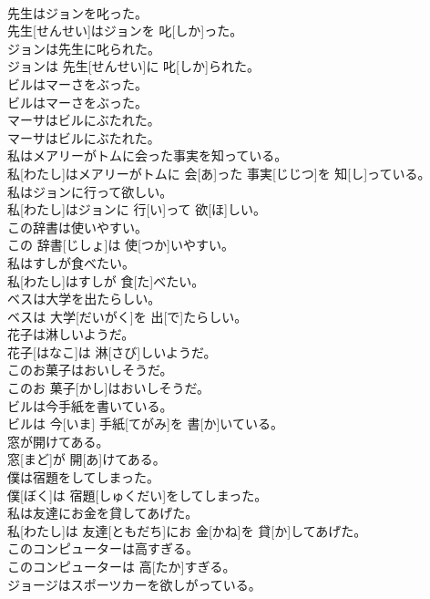 \documentclass[8pt]{extreport}
\begin{document}
\begin{CJK}{UTF8}{min}
\\	先生はジョンを叱った。	
\\	先生[せんせい]はジョンを 叱[しか]った。
\\	ジョンは先生に叱られた。	
\\	ジョンは 先生[せんせい]に 叱[しか]られた。
\\	ビルはマーさをぶった。	
\\	ビルはマーさをぶった。
\\	マーサはビルにぶたれた。	
\\	マーサはビルにぶたれた。
\\	私はメアリーがトムに会った事実を知っている。	
\\	私[わたし]はメアリーがトムに 会[あ]った 事実[じじつ]を 知[し]っている。
\\	私はジョンに行って欲しい。	
\\	私[わたし]はジョンに 行[い]って 欲[ほ]しい。
\\	この辞書は使いやすい。	
\\	この 辞書[じしょ]は 使[つか]いやすい。
\\	私はすしが食べたい。	
\\	私[わたし]はすしが 食[た]べたい。
\\	ベスは大学を出たらしい。	
\\	ベスは 大学[だいがく]を 出[で]たらしい。
\\	花子は淋しいようだ。	
\\	花子[はなこ]は 淋[さび]しいようだ。
\\	このお菓子はおいしそうだ。	
\\	このお 菓子[かし]はおいしそうだ。
\\	ビルは今手紙を書いている。	
\\	ビルは 今[いま] 手紙[てがみ]を 書[か]いている。
\\	窓が開けてある。	
\\	窓[まど]が 開[あ]けてある。
\\	僕は宿題をしてしまった。	
\\	僕[ぼく]は 宿題[しゅくだい]をしてしまった。
\\	私は友達にお金を貸してあげた。	
\\	私[わたし]は 友達[ともだち]にお 金[かね]を 貸[か]してあげた。
\\	このコンピューターは高すぎる。	
\\	このコンピューターは 高[たか]すぎる。
\\	ジョージはスポーツカーを欲しがっている。	

\end{CJK}
\end{document}
